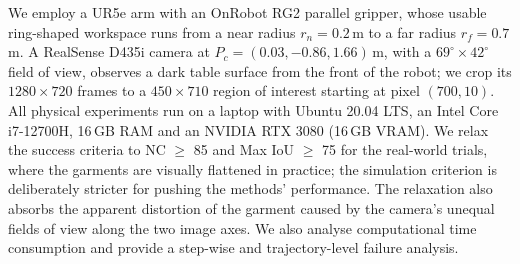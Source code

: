 \documentclass[journal]{IEEEtran}
\newif\ifshowrev\showrevtrue
\newcommand{\rev}[1]{\ifshowrev\textcolor{revblue}{#1}\else#1\fi}
\newif\ifshowrrev\showrrevtrue
\newcommand{\rrev}[1]{\ifshowrrev\textcolor{rrevred}{#1}\else#1\fi}
\begin{document}
\rev{We employ a UR5e arm with an OnRobot RG2 parallel gripper, whose usable ring-shaped workspace runs from a near radius $r_n = 0.2$\,m to a far radius $r_f = 0.7$\,m. A RealSense D435i camera at $P_c = (0.03, -0.86, 1.66)$\,m, with a $69^\circ \times 42^\circ$ field of view, observes a dark table surface from the front of the robot; we crop its $1280 \times 720$ frames to a $450 \times 710$ region of interest starting at pixel $(700, 10)$. All physical experiments run on a laptop with Ubuntu 20.04 LTS, an Intel Core i7-12700H, 16\,GB RAM and an NVIDIA RTX 3080 (16\,GB VRAM). \rrev{We relax the success criteria to NC $\geq$ 85 and Max IoU $\geq$ 75 for the real-world trials, where the garments are  visually flattened in practice; the simulation criterion is deliberately stricter for pushing the methods' performance. The relaxation also absorbs the apparent distortion of the garment caused by the camera's unequal fields of view along the two image axes.} We also analyse computational time consumption and provide a step-wise and trajectory-level failure analysis.}
\end{document}
